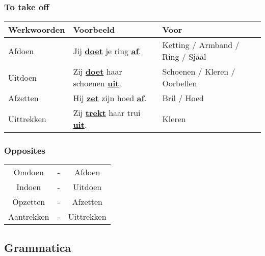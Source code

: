 \documentclass[a4paper,14pt]{extarticle}
\newcommand{\emp}[1]{\underline{\textbf{#1}}}
\begin{document}
\subsubsection{To take off}
\begin{tabularx}{\textwidth}{ p{} p{} p{} }
 \hline
 Werkwoorden & Voorbeeld & Voor \\
 \hline
 Afdoen & Jij \emp{doet} je ring \emp{af}. & Ketting / Armband / Ring / Sjaal \\
 Uitdoen & Zij \emp{doet} haar schoenen \emp{uit}. & Schoenen / Kleren / Oorbellen \\
 Afzetten & Hij \emp{zet} zijn hoed \emp{af}. & Bril / Hoed \\
 Uittrekken & Zij \emp{trekt} haar trui \emp{uit}. & Kleren \\
\end{tabularx}
\subsubsection{Opposites}
\begin{center}
\begin{tabularx}{180pt}{ c c c }
 \hline
 Omdoen & - & Afdoen \\
 Indoen & - & Uitdoen \\
 Opzetten & - & Afzetten \\
 Aantrekken & - & Uittrekken \\
\end{tabularx}
\end{center}
\subsection{Grammatica}
\end{document}

